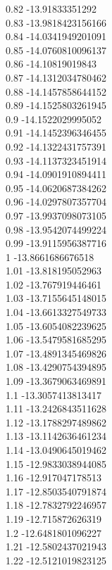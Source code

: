 {0.82	-13.91833351292\\
0.83	-13.9818423156166\\
0.84	-14.0341949201091\\
0.85	-14.0760810096137\\
0.86	-14.10819019843\\
0.87	-14.1312034780462\\
0.88	-14.1457858644152\\
0.89	-14.1525803261945\\
0.9	-14.1522029995052\\
0.91	-14.1452396346455\\
0.92	-14.1322431757391\\
0.93	-14.1137323451914\\
0.94	-14.0901910894411\\
0.95	-14.0620687384262\\
0.96	-14.0297807357704\\
0.97	-13.9937098073105\\
0.98	-13.9542074499224\\
0.99	-13.9115956387716\\
1	-13.8661686676518\\
1.01	-13.818195052963\\
1.02	-13.767919446461\\
1.03	-13.7155645148015\\
1.04	-13.6613327549733\\
1.05	-13.6054082239625\\
1.06	-13.5479581685295\\
1.07	-13.4891345469826\\
1.08	-13.4290754394895\\
1.09	-13.3679063469891\\
1.1	-13.3057413813417\\
1.11	-13.2426843511628\\
1.12	-13.1788297489862\\
1.13	-13.1142636461234\\
1.14	-13.0490645019462\\
1.15	-12.9833038944085\\
1.16	-12.917047178513\\
1.17	-12.8503540791874\\
1.18	-12.7832792246957\\
1.19	-12.715872626319\\
1.2	-12.6481801096227\\
1.21	-12.5802437021943\\
1.22	-12.5121019823125\\
}
